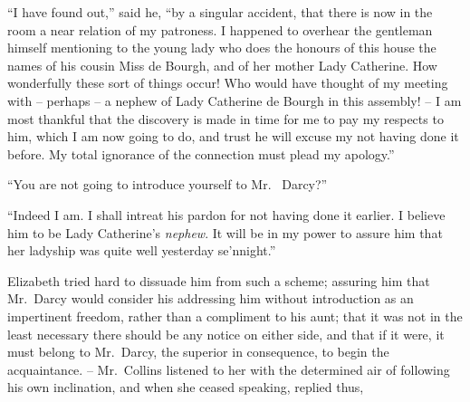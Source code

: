 “I have found out,” said he, “by a singular accident,
that there is now in the room a near relation of my
patroness. I happened to overhear the gentleman himself
mentioning to the young lady who does the honours of
this house the names of his cousin Miss de Bourgh, and of
her mother Lady Catherine. How wonderfully these sort
of things occur! Who would have thought of my meeting
with -- perhaps -- a nephew of Lady Catherine de Bourgh
in this assembly! -- I am most thankful that the discovery
is made in time for me to pay my respects to him, which
I am now going to do, and trust he will excuse my not
having done it before. My total ignorance of the connection
must plead my apology.”

“You are not going to introduce yourself to Mr.\ %
Darcy?”

“Indeed I am. I shall intreat his pardon for not
having done it earlier. I believe him to be Lady Catherine’s
\textit{nephew}. It will be in my power to assure him that her
ladyship was quite well yesterday se’nnight.”

Elizabeth tried hard to dissuade him from such a
scheme; assuring him that Mr.\ Darcy would consider his
addressing him without introduction as an impertinent
freedom, rather than a compliment to his aunt; that it
was not in the least necessary there should be any notice
on either side, and that if it were, it must belong to
Mr.\ Darcy, the superior in consequence, to begin the
acquaintance. -- Mr.\ Collins listened to her with the determined
air of following his own inclination, and when she
ceased speaking, replied thus,

